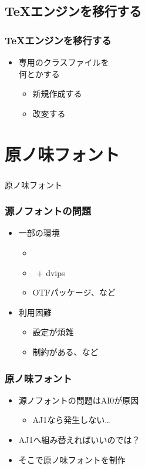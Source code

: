 \subsection{\TeX エンジンを移行する}
\begin{frame}\frametitle{\TeX エンジンを移行する}
  \begin{itemize}
  \item \pLaTeX 専用のクラスファイルを \\
    何とかする
    \begin{itemize}
    \item 新規作成する
    \item 改変する
    \end{itemize}
  \end{itemize}
\end{frame}

\section{原ノ味フォント}
\begin{frame}\frametitle{}
  \centering
  原ノ味フォント
\end{frame}

\begin{frame}\frametitle{源ノフォントの問題}
  \begin{itemize}
  \item 一部の環境
    \begin{itemize}
    \item \pTeX
    \item \upTeX \ + dvips
    \item OTFパッケージ、など
    \end{itemize}
  \item 利用困難
    \begin{itemize}
    \item 設定が煩雑
    \item 制約がある、など
    \end{itemize}
  \end{itemize}
\end{frame}

\begin{frame}\frametitle{原ノ味フォント}
  \begin{itemize}
  \item 源ノフォントの問題はAI0が原因
    \begin{itemize}
    \item AJ1なら発生しない…
    \end{itemize}
  \item AJ1へ組み替えればいいのでは？
  \item そこで\alert{原ノ味フォント}を制作
  \end{itemize}
\end{frame}

